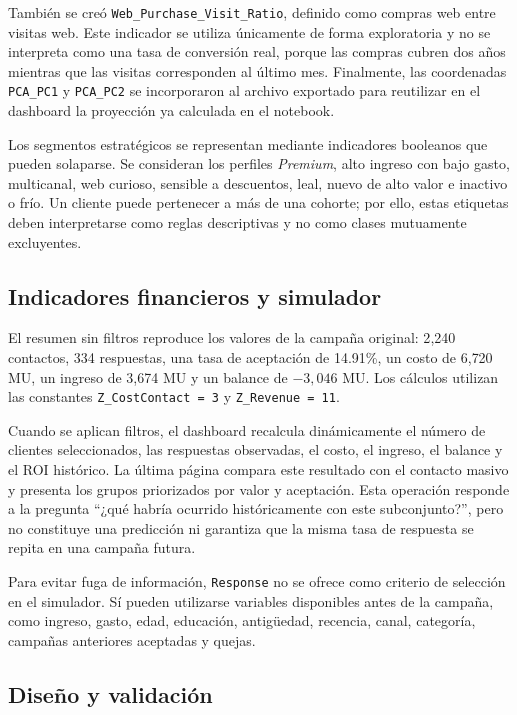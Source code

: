\documentclass[12pt]{article}
\begin{document}
También se creó \texttt{Web\_Purchase\_Visit\_Ratio}, definido como compras web entre visitas web. Este indicador se utiliza únicamente de forma exploratoria y no se interpreta como una tasa de conversión real, porque las compras cubren dos años mientras que las visitas corresponden al último mes. Finalmente, las coordenadas \texttt{PCA\_PC1} y \texttt{PCA\_PC2} se incorporaron al archivo exportado para reutilizar en el dashboard la proyección ya calculada en el notebook.

Los segmentos estratégicos se representan mediante indicadores booleanos que pueden solaparse. Se consideran los perfiles \textit{Premium}, alto ingreso con bajo gasto, multicanal, web curioso, sensible a descuentos, leal, nuevo de alto valor e inactivo o frío. Un cliente puede pertenecer a más de una cohorte; por ello, estas etiquetas deben interpretarse como reglas descriptivas y no como clases mutuamente excluyentes.

\subsection*{Indicadores financieros y simulador}

El resumen sin filtros reproduce los valores de la campaña original: 2{,}240 contactos, 334 respuestas, una tasa de aceptación de 14.91\%, un costo de 6{,}720 MU, un ingreso de 3{,}674 MU y un balance de $-3{,}046$ MU. Los cálculos utilizan las constantes \texttt{Z\_CostContact = 3} y \texttt{Z\_Revenue = 11}.

Cuando se aplican filtros, el dashboard recalcula dinámicamente el número de clientes seleccionados, las respuestas observadas, el costo, el ingreso, el balance y el ROI histórico. La última página compara este resultado con el contacto masivo y presenta los grupos priorizados por valor y aceptación. Esta operación responde a la pregunta ``¿qué habría ocurrido históricamente con este subconjunto?'', pero no constituye una predicción ni garantiza que la misma tasa de respuesta se repita en una campaña futura.

Para evitar fuga de información, \texttt{Response} no se ofrece como criterio de selección en el simulador. Sí pueden utilizarse variables disponibles antes de la campaña, como ingreso, gasto, edad, educación, antigüedad, recencia, canal, categoría, campañas anteriores aceptadas y quejas.

\subsection*{Diseño y validación}
\end{document}
